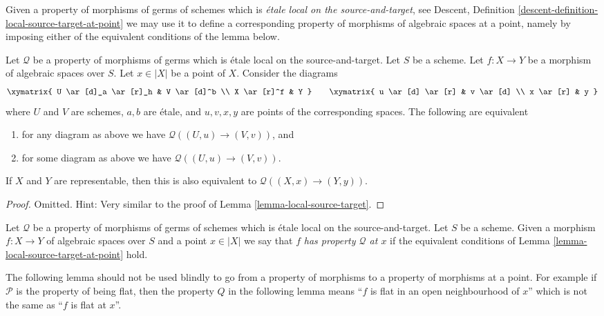 \noindent
Given a property of morphisms of germs of schemes which is {\it \'etale local
on the source-and-target}, see
Descent, Definition \ref{descent-definition-local-source-target-at-point}
we may use it to define a corresponding property of morphisms of
algebraic spaces at a point, namely by imposing either of
the equivalent conditions of the lemma below.

\begin{lemma}
\label{lemma-local-source-target-at-point}
Let $\mathcal{Q}$ be a property of morphisms of germs which is
\'etale local on the source-and-target.
Let $S$ be a scheme.
Let $f : X \to Y$ be a morphism of algebraic spaces over $S$.
Let $x \in |X|$ be a point of $X$.
Consider the diagrams
$$
\xymatrix{
U \ar[d]_a \ar[r]_h & V \ar[d]^b \\
X \ar[r]^f & Y
}
\quad\quad
\xymatrix{
u \ar[d] \ar[r] & v \ar[d] \\
x \ar[r] & y
}
$$
where $U$ and $V$ are schemes, $a, b$ are \'etale, and $u, v, x, y$
are points of the corresponding spaces.
The following are equivalent
\begin{enumerate}
\item for any diagram as above we have $\mathcal{Q}((U, u) \to (V, v))$, and
\item for some diagram as above we have $\mathcal{Q}((U, u) \to (V, v))$.
\end{enumerate}
If $X$ and $Y$ are representable, then this is also
equivalent to $\mathcal{Q}((X, x) \to (Y, y))$.
\end{lemma}

\begin{proof}
Omitted. Hint: Very similar to the proof of
Lemma \ref{lemma-local-source-target}.
\end{proof}

\begin{definition}
\label{definition-P-at-point}
Let $\mathcal{Q}$ be a property of morphisms of germs
of schemes which is \'etale local on the source-and-target.
Let $S$ be a scheme.
Given a morphism $f : X \to Y$ of algebraic spaces over $S$ and
a point $x \in |X|$ we say that $f$
{\it has property $\mathcal{Q}$ at $x$} if the equivalent conditions of
Lemma \ref{lemma-local-source-target-at-point}
hold.
\end{definition}

\noindent
The following lemma should not be used blindly to go from a property of
morphisms to a property of morphisms at a point. For example if
$\mathcal{P}$ is the property of being flat, then the property
$Q$ in the following lemma means ``$f$ is flat in an open neighbourhood
of $x$'' which is not the same as ``$f$ is flat at $x$''.

